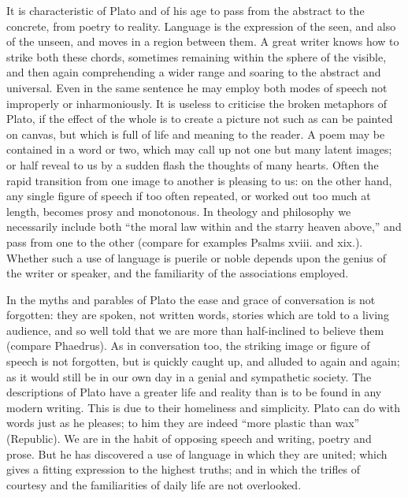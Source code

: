 \documentclass[11pt,letter]{article}
\begin{document}
\par  It is characteristic of Plato and of his age to pass from the abstract to the concrete, from poetry to reality. Language is the expression of the seen, and also of the unseen, and moves in a region between them. A great writer knows how to strike both these chords, sometimes remaining within the sphere of the visible, and then again comprehending a wider range and soaring to the abstract and universal. Even in the same sentence he may employ both modes of speech not improperly or inharmoniously. It is useless to criticise the broken metaphors of Plato, if the effect of the whole is to create a picture not such as can be painted on canvas, but which is full of life and meaning to the reader. A poem may be contained in a word or two, which may call up not one but many latent images; or half reveal to us by a sudden flash the thoughts of many hearts. Often the rapid transition from one image to another is pleasing to us: on the other hand, any single figure of speech if too often repeated, or worked out too much at length, becomes prosy and monotonous. In theology and philosophy we necessarily include both “the moral law within and the starry heaven above,” and pass from one to the other (compare for examples Psalms xviii. and xix.). Whether such a use of language is puerile or noble depends upon the genius of the writer or speaker, and the familiarity of the associations employed.

\par  In the myths and parables of Plato the ease and grace of conversation is not forgotten: they are spoken, not written words, stories which are told to a living audience, and so well told that we are more than half-inclined to believe them (compare Phaedrus). As in conversation too, the striking image or figure of speech is not forgotten, but is quickly caught up, and alluded to again and again; as it would still be in our own day in a genial and sympathetic society. The descriptions of Plato have a greater life and reality than is to be found in any modern writing. This is due to their homeliness and simplicity. Plato can do with words just as he pleases; to him they are indeed “more plastic than wax” (Republic). We are in the habit of opposing speech and writing, poetry and prose. But he has discovered a use of language in which they are united; which gives a fitting expression to the highest truths; and in which the trifles of courtesy and the familiarities of daily life are not overlooked.

\par 
\end{document}
